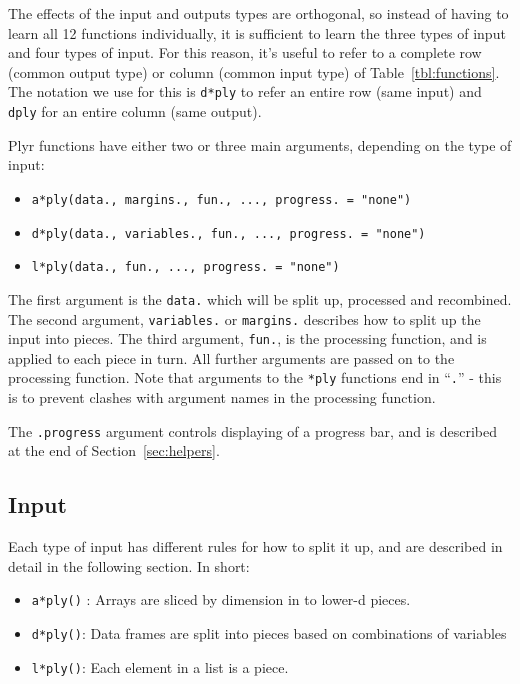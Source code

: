 \documentclass[letterpaper,oneside]{scrartcl}
\newcommand{\code}[1]{\lstinline!#1!}
\newcommand{\f}[1]{\lstinline!#1()!}
\begin{document}
The effects of the input and outputs types are orthogonal, so instead of having to learn all 12 functions individually, it is sufficient to learn the three types of input and four types of input.  For this reason, it's useful to refer to a complete row (common output type) or column (common input type) of Table~\ref{tbl:functions}.  The notation we use for this is {\tt d*ply} to refer an entire row (same input) and {\tt *dply} for an entire column (same output).

Plyr functions have either two or three main arguments, depending on the type of input:

\begin{itemize}
  \item {\tt a*ply(data., margins., fun., ..., progress. = "none")}
  \item {\tt d*ply(data., variables., fun., ..., progress. = "none")}
  \item {\tt l*ply(data., fun., ..., progress. = "none")}
\end{itemize}

The first argument is the {\tt data.} which will be split up, processed and recombined.  The second argument, \code{variables.} or \code{margins.} describes how to split up the input into pieces.  The third argument, \code{fun.}, is the processing function, and is applied to each piece in turn.  All further arguments are passed on to the processing function.  Note that arguments to the {\tt **ply} functions end in  ``{\tt .}'' - this is to prevent clashes with argument names in the processing function.

The {\tt .progress} argument controls displaying of a progress bar, and is described at the end of Section~\ref{sec:helpers}.

\subsection{Input} 
\label{sec:input}

Each type of input has different rules for how to split it up, and are described in detail in the following section. In short:

\begin{itemize}
  \item \f{a*ply} : Arrays are sliced by dimension in to lower-d pieces. 
  
  \item \f{d*ply}: Data frames are split into pieces based on combinations of variables
  
  \item \f{l*ply}: Each element in a list is a piece.
  
\end{itemize}
\end{document}
